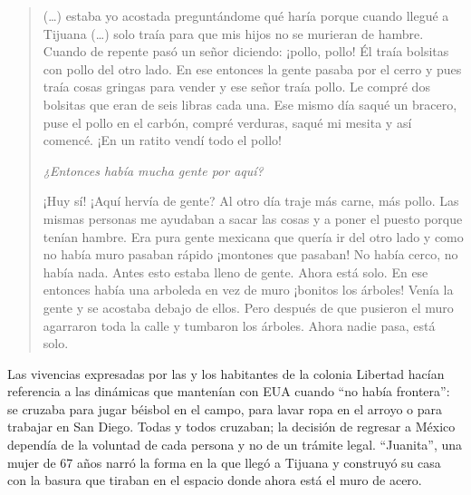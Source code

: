 \documentclass[
  spanish,
  11pt,
  a4paper,
]{scrbook}
\begin{document}
\begin{quote}
(\ldots) estaba yo acostada preguntándome qué haría porque cuando llegué
a Tijuana (\ldots) solo traía para que mis hijos no se murieran de
hambre. Cuando de repente pasó un señor diciendo: ¡pollo, pollo! Él
traía bolsitas con pollo del otro lado. En ese entonces la gente pasaba
por el cerro y pues traía cosas gringas para vender y ese señor traía
pollo. Le compré dos bolsitas que eran de seis libras cada una. Ese
mismo día saqué un bracero, puse el pollo en el carbón, compré verduras,
saqué mi mesita y así comencé. ¡En un ratito vendí todo el pollo!

\emph{¿Entonces había mucha gente por aquí?}

¡Huy sí! ¡Aquí hervía de gente? Al otro día traje más carne, más pollo.
Las mismas personas me ayudaban a sacar las cosas y a poner el puesto
porque tenían hambre. Era pura gente mexicana que quería ir del otro
lado y como no había muro pasaban rápido ¡montones que pasaban! No había
cerco, no había nada. Antes esto estaba lleno de gente. Ahora está solo.
En ese entonces había una arboleda en vez de muro ¡bonitos los árboles!
Venía la gente y se acostaba debajo de ellos. Pero después de que
pusieron el muro agarraron toda la calle y tumbaron los árboles. Ahora
nadie pasa, está solo.
\end{quote}

Las vivencias expresadas por las y los habitantes de la colonia Libertad
hacían referencia a las dinámicas que mantenían con EUA cuando ``no
había frontera'': se cruzaba para jugar béisbol en el campo, para lavar
ropa en el arroyo o para trabajar en San Diego. Todas y todos cruzaban;
la decisión de regresar a México dependía de la voluntad de cada persona
y no de un trámite legal. ``Juanita'', una mujer de 67 años narró la
forma en la que llegó a Tijuana y construyó su casa con la basura que
tiraban en el espacio donde ahora está el muro de acero.
\end{document}
